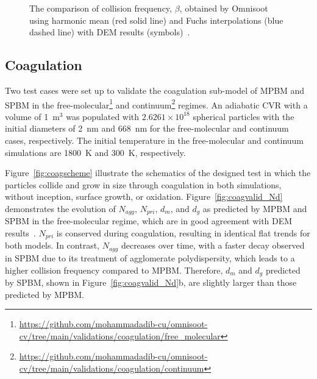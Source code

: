\begin{figure}[H]
	\centering
	\caption{The comparison of collision frequency, $\beta$, obtained by Omnisoot using harmonic mean (red solid line) and Fuchs interpolations (blue dashed line) with DEM results (symbols)~\citep{goudeli2015coagulation}.}
	\label{fig:kernelvalid} 
\end{figure}


\subsection{Coagulation}
Two test cases were set up to validate the coagulation sub-model of MPBM and SPBM in the free-molecular\footnote{\href{https://github.com/mohammadadib-cu/omnisoot-cv/tree/main/validations/coagulation/free_molecular}{https://github.com/mohammadadib-cu/omnisoot-cv/tree/main/validations/coagulation/free\_molecular}} and continuum\footnote{\href{https://github.com/mohammadadib-cu/omnisoot-cv/tree/main/validations/coagulation/continuum}{https://github.com/mohammadadib-cu/omnisoot-cv/tree/main/validations/coagulation/continuum}} regimes. An adiabatic CVR with a volume of 1~$\mathrm{m}^3$ was populated with $2.6261 \times 10^{18}$ spherical particles with the initial diameters of 2~nm and 668~nm for the free-molecular and continuum cases, respectively. The initial temperature in the free-molecular and continuum simulations are 1800~K and 300~K, respectively.

Figure~\ref{fig:coagscheme} illustrate the schematics of the designed test in which the particles collide and grow in size through coagulation in both simulations, without inception, surface growth, or oxidation. Figure~\ref{fig:coagvalid_Nd} demonstrates the evolution of ${N_{agg}}$, ${N_{pri}}$, ${d_m}$, and ${d_g}$ as predicted by MPBM and SPBM in the free-molecular regime, which are in good agreement with DEM results~\citep{kholghy2021surface}. ${N_{pri}}$ is conserved during coagulation, resulting in identical flat trends for both models. In contrast, ${N_{agg}}$ decreases over time, with a faster decay observed in SPBM due to its treatment of agglomerate polydispersity, which leads to a higher collision frequency compared to MPBM. Therefore, $d_m$ and $d_g$  predicted by SPBM, shown in Figure~\ref{fig:coagvalid_Nd}b, are slightly larger than those predicted by MPBM.


